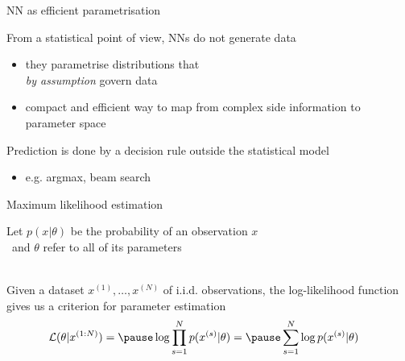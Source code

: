\begin{frame}{NN as efficient parametrisation}

From a statistical point of view, NNs do not generate data\\
\begin{itemize}
	\item \alert{they parametrise distributions} that \\
	\emph{by assumption} govern data
	\item compact and efficient way to \alert{map from complex side information to parameter space}
\end{itemize}

\vspace{10pt}

\pause
Prediction is done by a decision rule outside the statistical model
\begin{itemize}
	\item e.g. argmax, beam search
\end{itemize}

\end{frame}



\begin{frame}{Maximum likelihood estimation}

Let $p(x|\theta)$ be the probability of an observation $x$\\
~and $\theta$ refer to all of its parameters \\

~ \pause

Given a dataset $x^{(1)}, \ldots, x^{(N)}$ of i.i.d. observations, \pause
the log-likelihood function gives us a criterion for parameter estimation
\begin{equation*}
\begin{aligned}
\mathcal L(\theta|x^{(1:N)}) &= \pause \log \prod_{s=1}^N p(x^{(s)}|\theta) 
 = \pause \sum_{s=1}^N \log p(x^{(s)}|\theta)
\end{aligned}
\end{equation*} 


\end{frame}

